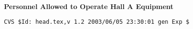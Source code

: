 \setlength{\oddsidemargin}{+0.5cm}
\setlength{\evensidemargin}{+0.5cm}
\setlength{\topmargin}{-2.5cm}
\setlength{\textwidth}{15.8cm}
\setlength{\textheight}{22.8cm}

\setlength{\baselineskip}{3.0pc}

\begin{center}
{\bf \Large Personnel Allowed to Operate Hall A Equipment}
\end{center}

\setlength{\baselineskip}{1.5pc}



%
%
{\small
\begin{verbatim}CVS $Id: head.tex,v 1.2 2003/06/05 23:30:01 gen Exp $\end{verbatim}
}

